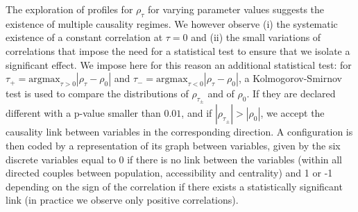 The exploration of profiles for $\rho_\tau$ for varying parameter values suggests the existence of multiple causality regimes. We however observe (i) the systematic existence of a constant correlation at $\tau = 0$ and (ii) the small variations of correlations that impose the need for a statistical test to ensure that we isolate a significant effect. We impose here for this reason an additional statistical test: for $\tau_+ = \textrm{argmax}_{\tau>0} \left|\rho_{\tau} - \rho_0\right|$ and $\tau_- = \textrm{argmax}_{\tau<0} \left|\rho_{\tau} - \rho_0\right|$, a Kolmogorov-Smirnov test is used to compare the distributions of $\rho_{\tau_{\pm}}$ and of $\rho_0$. If they are declared different with a p-value smaller than $0.01$, and if $\left|\rho_{\tau_{\pm}}\right| > \left|\rho_0\right|$, we accept the causality link between variables in the corresponding direction. A configuration is then coded by a representation of its graph between variables, given by the six discrete variables equal to 0 if there is no link between the variables (within all directed couples between population, accessibility and centrality) and 1 or -1 depending on the sign of the correlation if there exists a statistically significant link (in practice we observe only positive correlations).






